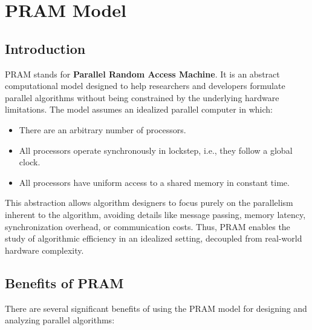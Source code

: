 \documentclass[12pt]{book}
\begin{document}
\chapter{PRAM Model}
\section{Introduction}
PRAM stands for \textbf{Parallel Random Access Machine}. It is an abstract computational model designed to help researchers and developers formulate parallel algorithms without being constrained by the underlying hardware limitations. The model assumes an idealized parallel computer in which:

\begin{itemize}
    \item There are an arbitrary number of processors.
    \item All processors operate synchronously in lockstep, i.e., they follow a global clock.
    \item All processors have uniform access to a shared memory in constant time.
\end{itemize}

This abstraction allows algorithm designers to focus purely on the parallelism inherent to the algorithm, avoiding details like message passing, memory latency, synchronization overhead, or communication costs. Thus, PRAM enables the study of algorithmic efficiency in an idealized setting, decoupled from real-world hardware complexity.

\section{Benefits of PRAM}
There are several significant benefits of using the PRAM model for designing and analyzing parallel algorithms:
\end{document}
